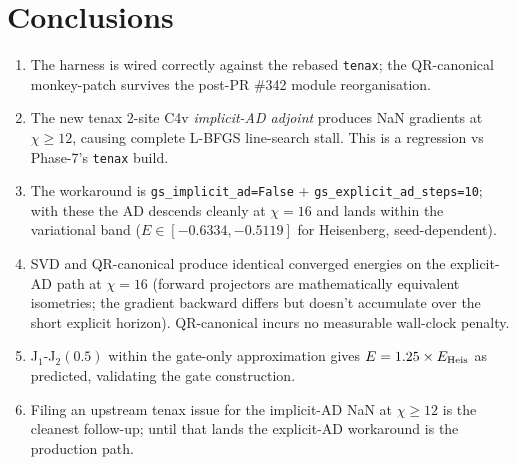 \documentclass[aps,prresearch,reprint,amsmath,amssymb,floatfix]{revtex4-2}
\newcommand{\tenax}{\texttt{tenax}}
\newcommand{\code}[1]{\texttt{#1}}
\begin{document}
\section{Conclusions}

\begin{enumerate}
  \item The harness is wired correctly against the rebased \tenax{}; the
        QR-canonical monkey-patch survives the post-PR \#342 module
        reorganisation.
  \item The new tenax 2-site C4v \emph{implicit-AD adjoint} produces NaN
        gradients at $\chi\!\geq\!12$, causing complete L-BFGS line-search
        stall.  This is a regression vs Phase-7's \tenax{} build.
  \item The workaround is \code{gs\_implicit\_ad=False} +
        \code{gs\_explicit\_ad\_steps=10}; with these the AD descends
        cleanly at $\chi=16$ and lands within the variational band
        ($E\!\in\![-0.6334, -0.5119]$ for Heisenberg, seed-dependent).
  \item SVD and QR-canonical produce identical converged energies on the
        explicit-AD path at $\chi=16$ (forward projectors are
        mathematically equivalent isometries; the gradient backward
        differs but doesn't accumulate over the short explicit horizon).
        QR-canonical incurs no measurable wall-clock penalty.
  \item J$_1$-J$_2(0.5)$ within the gate-only approximation gives
        $E = 1.25 \times E_{\rm Heis}$ as predicted, validating the
        gate construction.
  \item Filing an upstream tenax issue for the implicit-AD NaN at
        $\chi\!\geq\!12$ is the cleanest follow-up; until that lands the
        explicit-AD workaround is the production path.
\end{enumerate}



\end{document}
